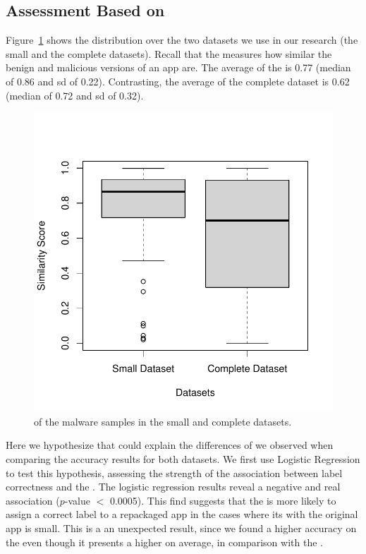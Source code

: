 \subsection{Assessment Based on \sscore}

Figure~\ref{fig:ss} shows the \sscore distribution
over the two datasets we use in our research
(the small and the complete datasets).
Recall that the \sscore measures how similar the
benign and malicious versions of an app are.
The average \sscore of the
\sds is 0.77 (median of 0.86 and sd of 0.22). Contrasting,
the average \sscore of the complete dataset is
0.62 (median of 0.72 and sd of 0.32).

\begin{figure}
  \includegraphics[width=\columnwidth]{images/similarity-1.pdf}
  \caption{\sscore of the malware samples in the small and complete datasets.}
  \label{fig:ss}
\end{figure}

Here we hypothesize that \sscore could explain
the differences of \mas we observed
when comparing the accuracy results for both
datasets. We first use Logistic Regression to test this hypothesis,
assessing the strength of the association between label correctness and
the \sscore. The logistic regression results reveal
a negative and real association ($p$-value $<$ 0.0005). This find suggests
that the \mas is more likely to assign a correct label to
a repackaged app in the cases where its \sscore with the original
app is small. This is a an unexpected result, since
we found a higher accuracy on the \sds even though
it presents a higher \sscore on average, in comparison with the \cds. 


